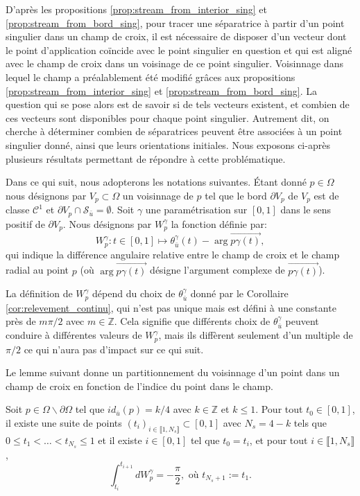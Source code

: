 D'après les propositions \ref{prop:stream_from_interior_sing} et \ref{prop:stream_from_bord_sing}, pour tracer une séparatrice à partir d'un point singulier dans un champ de croix, il est nécessaire de disposer d'un vecteur dont le point d'application coïncide avec le point singulier en question et qui est aligné avec le champ de croix dans un voisinage de ce point singulier. Voisinnage dans lequel le champ a préalablement été modifié grâces aux propositions \ref{prop:stream_from_interior_sing} et \ref{prop:stream_from_bord_sing}. La question qui se pose alors est de savoir si de tels vecteurs existent, et combien de ces vecteurs sont disponibles pour chaque point singulier. Autrement dit, on cherche à déterminer combien de séparatrices peuvent être associées à un point singulier donné, ainsi que leurs orientations initiales. Nous exposons ci-après plusieurs résultats permettant de répondre à cette problématique.

Dans ce qui suit, nous adopterons les notations suivantes. \'Etant donné $p\in\Omega$ nous désignons par $V_p\subset\Omega$ un voisinnage de $p$ tel que le bord $\partial V_p$ de $V_p$ est de classe $\mathcal{C}^1$ et $\partial V_p\cap\mathcal{S}_{\bar{u}}=\emptyset$. Soit $\gamma$ une paramétrisation sur $[0, 1]$ dans le sens positif de $\partial V_p$. Nous désignons par $W_p^\gamma$ la fonction définie par:
\begin{equation}
\label{eqn:Winding}
W_p^\gamma:t\in[0, 1]\longmapsto \theta^\gamma_{\bar{u}}(t)-\arg \overrightarrow{p\gamma(t)},
\end{equation}
qui indique la différence angulaire relative entre le champ de croix et le champ radial au point $p$ (où $\arg \overrightarrow{p\gamma(t)}$ désigne l'argument complexe de $\overrightarrow{p\gamma(t)}$).

\begin{remark}
\label{rmk:W_p_gamma}
La définition de $W_p^\gamma$ dépend du choix de $\theta_{\bar{u}}^\gamma$ donné par le Corollaire \ref{cor:relevement_continu}, qui n'est pas unique mais est défini à une constante près de $m\pi/2$ avec $m\in\mathbb{Z}$. Cela signifie que différents choix de $\theta_{\bar{u}}^\gamma$ peuvent conduire à différentes valeurs de $W_p^\gamma$, mais ils diffèrent seulement d'un multiple de $\pi/2$ ce qui n'aura pas d'impact sur ce qui suit.
\end{remark}
Le lemme suivant donne un partitionnement du voisinnage d'un point dans un champ de croix en fonction de l'indice du point dans le champ.
\begin{lemma}
\label{lem:decoup_voisinnage}
Soit $p\in\Omega\backslash\partial\Omega$ tel que $id_{\bar{u}}(p)=k/4$ avec $k\in\mathbb{Z}$ et $k\leq 1$. Pour tout $t_0\in[0, 1]$, il existe une suite de points $(t_i)_{i\in\llbracket1, N_s\rrbracket}\subset[0, 1]$ avec $N_s=4-k$ tels que $0\leq t_1<\dots< t_{N_s}\leq 1$ et il existe $i\in [0, 1]$ tel que $t_0=t_i$, et pour tout $i\in\llbracket 1, N_s\rrbracket$,
$$\int_{t_i}^{t_{i+1}}dW_p^\gamma=-\frac{\pi}{2},\mbox{ où }t_{N_s+1}:=t_1.$$
\end{lemma}

